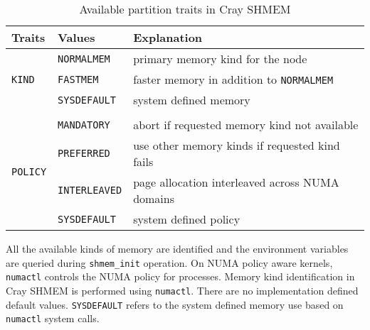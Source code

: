 \begin{table}[ht!]
\centering
\vspace{-20pt}
\begin{tabular}{|l l l|}\hline
    Traits & Values & Explanation\\[0.5ex]
    \hline\hline
    \multirow{3}{4em}{\texttt{KIND}} & \texttt{NORMALMEM}  & primary memory kind for
                                                             the node \\
                            & \texttt{FASTMEM}    & faster memory in addition
                                                    to \texttt{NORMALMEM} \\
                            & \texttt{SYSDEFAULT} & system defined memory \\
                            &&\\
    \multirow{4}{4em}{\texttt{POLICY}} & \texttt{MANDATORY}
                                                     & abort if requested memory
                                                       kind not available \\
                              & \texttt{PREFERRED}   & use other memory kinds if
                                                       requested kind fails \\
                              & \texttt{INTERLEAVED} & page allocation interleaved
                                                       across NUMA domains \\
                              & \texttt{SYSDEFAULT}  & system defined policy \\
    \hline
\end{tabular}
\caption{Available partition traits in Cray SHMEM}
\label{tab:trait}
\end{table}
\vspace{-20pt}

All the available kinds of memory are identified and the environment
variables are queried during \texttt{shmem\_init} operation. On NUMA
policy aware kernels,
\texttt{numactl} controls the NUMA policy for processes.%
Memory kind identification in Cray SHMEM
is performed using \texttt{numactl}. There are no implementation defined
default values. \texttt{SYSDEFAULT} refers to the system defined memory
use based
on \texttt{numactl} system calls.